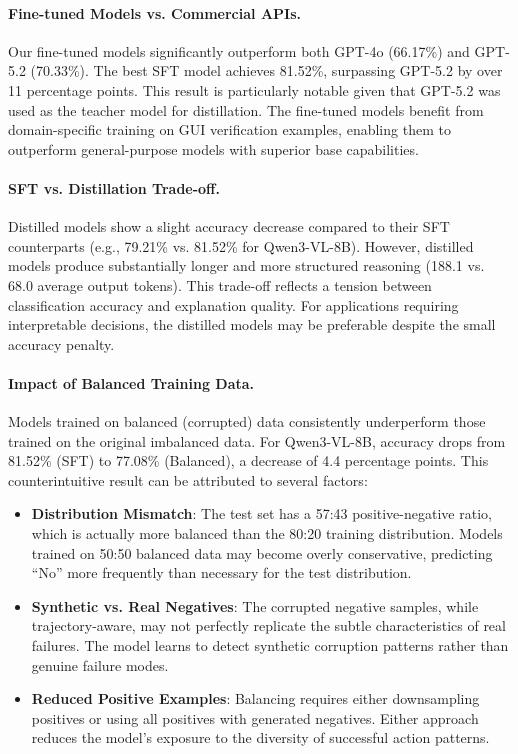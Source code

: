 \documentclass[11pt,a4paper]{article}
\begin{document}
\paragraph{Fine-tuned Models vs. Commercial APIs.} Our fine-tuned models significantly outperform both GPT-4o (66.17\%) and GPT-5.2 (70.33\%). The best SFT model achieves 81.52\%, surpassing GPT-5.2 by over 11 percentage points. This result is particularly notable given that GPT-5.2 was used as the teacher model for distillation. The fine-tuned models benefit from domain-specific training on GUI verification examples, enabling them to outperform general-purpose models with superior base capabilities.

\paragraph{SFT vs. Distillation Trade-off.} Distilled models show a slight accuracy decrease compared to their SFT counterparts (e.g., 79.21\% vs. 81.52\% for Qwen3-VL-8B). However, distilled models produce substantially longer and more structured reasoning (188.1 vs. 68.0 average output tokens). This trade-off reflects a tension between classification accuracy and explanation quality. For applications requiring interpretable decisions, the distilled models may be preferable despite the small accuracy penalty.

\paragraph{Impact of Balanced Training Data.} Models trained on balanced (corrupted) data consistently underperform those trained on the original imbalanced data. For Qwen3-VL-8B, accuracy drops from 81.52\% (SFT) to 77.08\% (Balanced), a decrease of 4.4 percentage points. This counterintuitive result can be attributed to several factors:

\begin{itemize}
    \item \textbf{Distribution Mismatch}: The test set has a 57:43 positive-negative ratio, which is actually more balanced than the 80:20 training distribution. Models trained on 50:50 balanced data may become overly conservative, predicting ``No'' more frequently than necessary for the test distribution.
    \item \textbf{Synthetic vs. Real Negatives}: The corrupted negative samples, while trajectory-aware, may not perfectly replicate the subtle characteristics of real failures. The model learns to detect synthetic corruption patterns rather than genuine failure modes.
    \item \textbf{Reduced Positive Examples}: Balancing requires either downsampling positives or using all positives with generated negatives. Either approach reduces the model's exposure to the diversity of successful action patterns.
\end{itemize}
\end{document}
